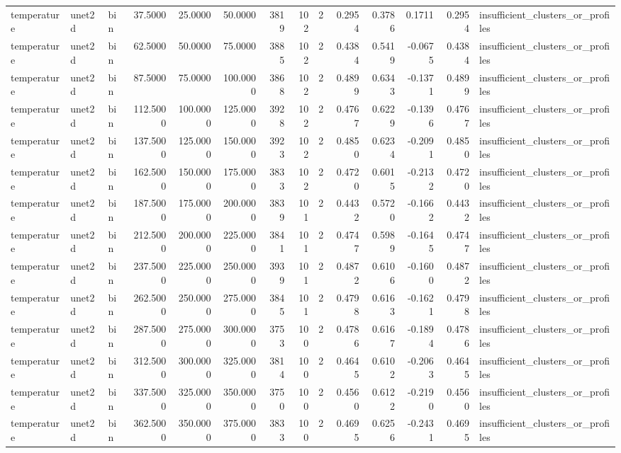 \begin{tabular}{lllrrrrrrrrrrl}
temperature & unet2d & bin & 37.5000 & 25.0000 & 50.0000 & 3819 & 102 & 2 & 0.2954 & 0.3786 & 0.1711 & 0.2954 & insufficient_clusters_or_profiles \\
temperature & unet2d & bin & 62.5000 & 50.0000 & 75.0000 & 3885 & 102 & 2 & 0.4384 & 0.5419 & -0.0675 & 0.4384 & insufficient_clusters_or_profiles \\
temperature & unet2d & bin & 87.5000 & 75.0000 & 100.0000 & 3868 & 102 & 2 & 0.4899 & 0.6343 & -0.1371 & 0.4899 & insufficient_clusters_or_profiles \\
temperature & unet2d & bin & 112.5000 & 100.0000 & 125.0000 & 3928 & 102 & 2 & 0.4767 & 0.6229 & -0.1396 & 0.4767 & insufficient_clusters_or_profiles \\
temperature & unet2d & bin & 137.5000 & 125.0000 & 150.0000 & 3923 & 102 & 2 & 0.4850 & 0.6234 & -0.2091 & 0.4850 & insufficient_clusters_or_profiles \\
temperature & unet2d & bin & 162.5000 & 150.0000 & 175.0000 & 3833 & 102 & 2 & 0.4720 & 0.6015 & -0.2132 & 0.4720 & insufficient_clusters_or_profiles \\
temperature & unet2d & bin & 187.5000 & 175.0000 & 200.0000 & 3839 & 101 & 2 & 0.4432 & 0.5720 & -0.1662 & 0.4432 & insufficient_clusters_or_profiles \\
temperature & unet2d & bin & 212.5000 & 200.0000 & 225.0000 & 3841 & 101 & 2 & 0.4747 & 0.5989 & -0.1645 & 0.4747 & insufficient_clusters_or_profiles \\
temperature & unet2d & bin & 237.5000 & 225.0000 & 250.0000 & 3939 & 101 & 2 & 0.4872 & 0.6106 & -0.1600 & 0.4872 & insufficient_clusters_or_profiles \\
temperature & unet2d & bin & 262.5000 & 250.0000 & 275.0000 & 3845 & 101 & 2 & 0.4798 & 0.6163 & -0.1621 & 0.4798 & insufficient_clusters_or_profiles \\
temperature & unet2d & bin & 287.5000 & 275.0000 & 300.0000 & 3753 & 100 & 2 & 0.4786 & 0.6167 & -0.1894 & 0.4786 & insufficient_clusters_or_profiles \\
temperature & unet2d & bin & 312.5000 & 300.0000 & 325.0000 & 3814 & 100 & 2 & 0.4645 & 0.6102 & -0.2063 & 0.4645 & insufficient_clusters_or_profiles \\
temperature & unet2d & bin & 337.5000 & 325.0000 & 350.0000 & 3750 & 100 & 2 & 0.4560 & 0.6122 & -0.2190 & 0.4560 & insufficient_clusters_or_profiles \\
temperature & unet2d & bin & 362.5000 & 350.0000 & 375.0000 & 3833 & 100 & 2 & 0.4695 & 0.6256 & -0.2431 & 0.4695 & insufficient_clusters_or_profiles \\

\end{tabular}
